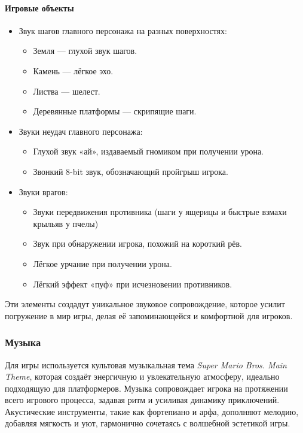 \documentclass{article}
\begin{document}
\paragraph{Игровые объекты}  
\begin{itemize}
    \item Звук шагов главного персонажа на разных поверхностях:  
    \begin{itemize}
        \item Земля — глухой звук шагов.  
        \item Камень — лёгкое эхо.  
        \item Листва — шелест.  
        \item Деревянные платформы — скрипящие шаги.  
    \end{itemize}
    \item Звуки неудач главного персонажа:  
    \begin{itemize}
        \item Глухой звук «ай», издаваемый гномиком при получении урона.  
        \item Звонкий 8-bit звук, обозначающий пройгрыш игрока.  
    \end{itemize}
    \item Звуки врагов:  
    \begin{itemize}
        \item Звуки передвижения противника (шаги у ящерицы и быстрые взмахи крыльяв у пчелы)
        \item Звук при обнаружении игрока, похожий на короткий рёв.
        \item Лёгкое урчание при получении урона.  
        \item Лёгкий эффект «пуф» при исчезновении противников.  
    \end{itemize}
\end{itemize}

Эти элементы создадут уникальное звуковое сопровождение, которое усилит погружение в мир игры, делая её запоминающейся и комфортной для игроков.

\subsubsection{Музыка}

Для игры используется культовая музыкальная тема \textit{Super Mario Bros. Main Theme}, которая создаёт энергичную и увлекательную атмосферу, идеально подходящую для платформеров. Музыка сопровождает игрока на протяжении всего игрового процесса, задавая ритм и усиливая динамику приключений. Акустические инструменты, такие как фортепиано и арфа, дополняют мелодию, добавляя мягкость и уют, гармонично сочетаясь с волшебной эстетикой игры.
\end{document}
